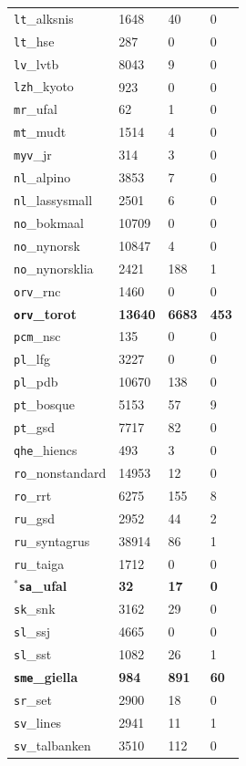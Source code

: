 \begin{table}[H]
{\begin{tabular}{|l|l|l|l|}
\texttt{lt}\_alksnis & 1648 & 40 & 0\\
\texttt{lt}\_hse & 287 & 0 & 0\\
\texttt{lv}\_lvtb & 8043 & 9 & 0\\
\texttt{lzh}\_kyoto & 923 & 0 & 0\\
\texttt{mr}\_ufal & 62 & 1 & 0\\
\texttt{mt}\_mudt & 1514 & 4 & 0\\
\texttt{myv}\_jr & 314 & 3 & 0\\
\texttt{nl}\_alpino & 3853 & 7 & 0\\
\texttt{nl}\_lassysmall & 2501 & 6 & 0\\
\texttt{no}\_bokmaal & 10709 & 0 & 0\\
\texttt{no}\_nynorsk & 10847 & 4 & 0\\
\texttt{no}\_nynorsklia & 2421 & 188 & 1\\
\texttt{orv}\_rnc & 1460 & 0 & 0\\
\textbf{\texttt{orv}\_torot} & \textbf{13640} & \textbf{6683} & \textbf{453}\\
\texttt{pcm}\_nsc & 135 & 0 & 0\\
\texttt{pl}\_lfg & 3227 & 0 & 0\\
\texttt{pl}\_pdb & 10670 & 138 & 0\\
\texttt{pt}\_bosque & 5153 & 57 & 9\\
\texttt{pt}\_gsd & 7717 & 82 & 0\\
\texttt{qhe}\_hiencs & 493 & 3 & 0\\
\texttt{ro}\_nonstandard & 14953 & 12 & 0\\
\texttt{ro}\_rrt & 6275 & 155 & 8\\
\texttt{ru}\_gsd & 2952 & 44 & 2\\
\texttt{ru}\_syntagrus & 38914 & 86 & 1\\
\texttt{ru}\_taiga & 1712 & 0 & 0\\
\textbf{\(^{*}\)\texttt{sa}\_ufal} & \textbf{32} & \textbf{17} & \textbf{0}\\
\texttt{sk}\_snk & 3162 & 29 & 0\\
\texttt{sl}\_ssj & 4665 & 0 & 0\\
\texttt{sl}\_sst & 1082 & 26 & 1\\
\textbf{\texttt{sme}\_giella} & \textbf{984} & \textbf{891} & \textbf{60}\\
\texttt{sr}\_set & 2900 & 18 & 0\\
\texttt{sv}\_lines & 2941 & 11 & 1\\
\texttt{sv}\_talbanken & 3510 & 112 & 0\\

\end{tabular}}
\end{table}

